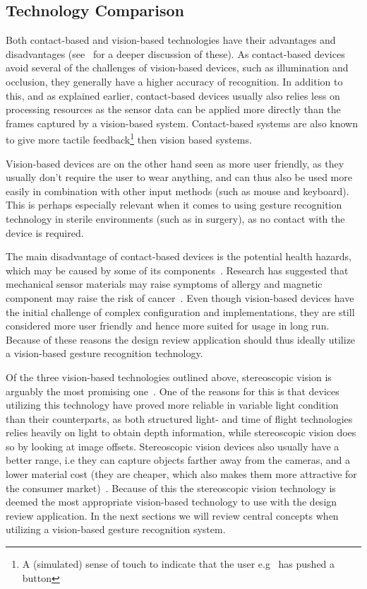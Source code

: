 \subsection{Technology Comparison}
\label{sec:vision_based_comparison}
Both contact-based and vision-based technologies have their advantages and disadvantages (see~\citet{Rautaray2015} for a deeper discussion of these). 
As contact-based devices avoid several of the challenges of vision-based devices, such as illumination and occlusion, they generally have a higher accuracy of recognition.
In addition to this, and as explained earlier, contact-based devices usually also relies less on processing resources as the sensor data can be applied more directly than the
frames captured by a vision-based system. Contact-based systems are also known to give more tactile feedback\footnote{A (simulated) sense of touch to indicate that the user e.g~
has pushed a button} then vision based systems.

Vision-based devices are on the other hand seen as more user friendly, as they usually don't require the user to wear anything, and can thus also be used more easily
in combination with other input methods (such as mouse and keyboard). This is perhaps especially relevant when it comes to using gesture recognition technology in
sterile environments (such as in surgery), as no contact with the device is required. 

The main disadvantage of contact-based devices is the potential health hazards, which may be caused by some of its components~\citep{Schultz2003}. 
Research has suggested that mechanical sensor materials may raise symptoms of allergy and magnetic component may raise the risk of cancer~\citep{Nishikawa2003}. 
Even though vision-based devices have the initial challenge of complex configuration and implementations, 
they are still considered more user friendly and hence more suited for usage in long run. 
Because of these reasons the design review application should thus ideally utilize a vision-based gesture recognition technology. 

Of the three vision-based technologies outlined above, stereoscopic vision is arguably the most promising one~\citep{Ko2012}.
One of the reasons for this is that devices utilizing this technology have proved more reliable in variable light condition than their counterparts, 
as both structured light- and time of flight technologies relies heavily on light to obtain depth information, while stereoscopic vision does so by looking at image offsets.
Stereoscopic vision devices also usually have a better range, i.e they can capture objects farther away from the cameras, and 
a lower material cost (they are cheaper, which also makes them more attractive for the consumer market)~\citep{Ko2012}.
Because of this the stereoscopic vision technology is deemed the most appropriate vision-based technology to use with the design review application.
In the next sections we will review central concepts when utilizing a vision-based gesture recognition system.

